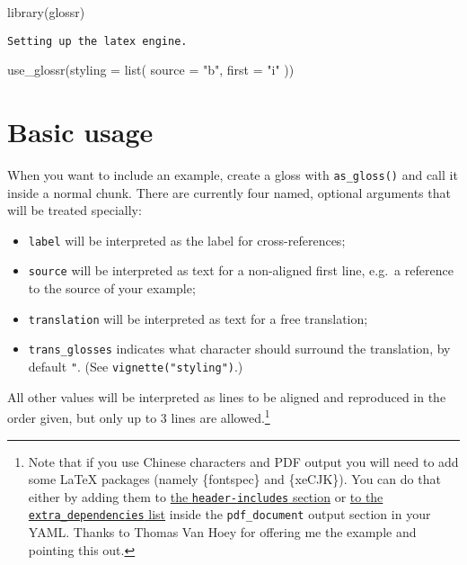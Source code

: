 \documentclass[
  letterpaper,
  DIV=11,
  numbers=noendperiod]{scrartcl}
\newenvironment{Shaded}{\begin{snugshade}}{\end{snugshade}}
\newcommand{\AttributeTok}[1]{\textcolor[rgb]{0.40,0.45,0.13}{#1}}
\newcommand{\FunctionTok}[1]{\textcolor[rgb]{0.28,0.35,0.67}{#1}}
\newcommand{\NormalTok}[1]{\textcolor[rgb]{0.00,0.23,0.31}{#1}}
\newcommand{\StringTok}[1]{\textcolor[rgb]{0.13,0.47,0.30}{#1}}
\begin{document}
\begin{Shaded}
\begin{Highlighting}[]
\FunctionTok{library}\NormalTok{(glossr)}
\end{Highlighting}
\end{Shaded}

\begin{verbatim}
Setting up the latex engine.
\end{verbatim}

\begin{Shaded}
\begin{Highlighting}[]
\FunctionTok{use\_glossr}\NormalTok{(}\AttributeTok{styling =} \FunctionTok{list}\NormalTok{(}
  \AttributeTok{source =} \StringTok{"b"}\NormalTok{,}
  \AttributeTok{first =} \StringTok{"i"}
\NormalTok{))}
\end{Highlighting}
\end{Shaded}

\section{Basic usage}\label{basic-usage}

When you want to include an example, create a gloss with
\texttt{as\_gloss()} and call it inside a normal chunk. There are
currently four named, optional arguments that will be treated specially:

\begin{itemize}
\item
  \texttt{label} will be interpreted as the label for cross-references;
\item
  \texttt{source} will be interpreted as text for a non-aligned first
  line, e.g.~a reference to the source of your example;
\item
  \texttt{translation} will be interpreted as text for a free
  translation;
\item
  \texttt{trans\_glosses} indicates what character should surround the
  translation, by default \texttt{"}. (See
  \texttt{vignette("styling")}.)
\end{itemize}

All other values will be interpreted as lines to be aligned and
reproduced in the order given, but only up to 3 lines are
allowed.\footnote{Note that if you use Chinese characters and PDF output
  you will need to add some LaTeX packages (namely \{fontspec\} and
  \{xeCJK\}). You can do that either by adding them to
  \href{https://bookdown.org/yihui/rmarkdown-cookbook/latex-preamble.html}{the
  \texttt{header-includes} section} or
  \href{https://bookdown.org/yihui/rmarkdown-cookbook/latex-extra.html}{to
  the \texttt{extra\_dependencies} list} inside the
  \texttt{pdf\_document} output section in your YAML. Thanks to Thomas
  Van Hoey for offering me the example and pointing this out.}
\end{document}
